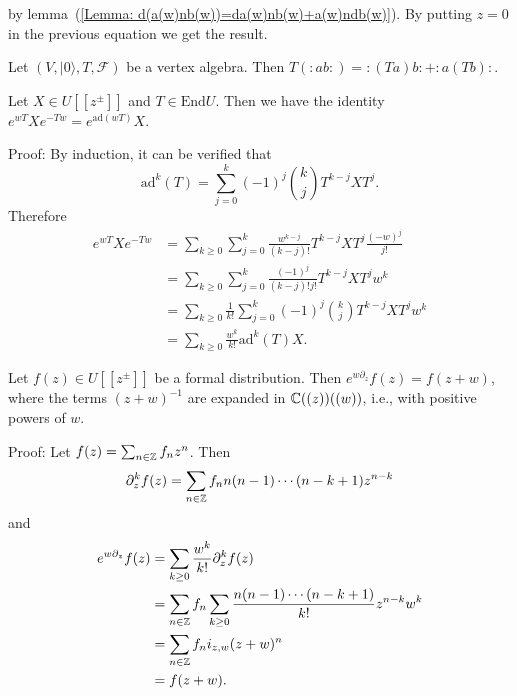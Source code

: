 by lemma~(\ref{Lemma: d(a(w)nb(w))=da(w)nb(w)+a(w)ndb(w)}). By putting $z=0$ in the previous equation we get the result.
\begin{dang}
    \begin{corollary}\label{Corollary: T acts as a derivaiton of the normal ordered product}\cite{de2006finite}
        Let $(V,|0\rangle,T,\mathcal{F})$ be a vertex algebra. Then $T(:ab:)=:(Ta)b:+:a(Tb):$.
    \end{corollary}
\end{dang}
\begin{dang}
    \begin{lemma}\label{Lemma: cojugation by the action of infinitesimal translations}
        Let $X\in U[[z^\pm]]$ and $T\in\text{End}U$. Then we have the identity $e^{wT}Xe^{-Tw}=e^{\text{ad}(wT)}X$.
    \end{lemma}
\end{dang}
Proof: By induction, it can be verified that 
\begin{equation}
    \text{ad}^k(T)=\sum_{j=0}^k(-1)^j\binom{k}{j}T^{k-j}XT^j.
\end{equation}
Therefore
\begin{equation}
    \begin{split}
        e^{wT}Xe^{-Tw}&=\sum_{k\geq0}\sum_{j=0}^k\frac{w^{k-j}}{(k-j)!}T^{k-j}XT^j\frac{(-w)^j}{j!}\\
        &=\sum_{k\geq0}\sum_{j=0}^k\frac{(-1)^j}{(k-j)!j!}T^{k-j}XT^jw^k\\
        &=\sum_{k\geq0}\frac{1}{k!}\sum_{j=0}^k(-1)^j\binom{k}{j}T^{k-j}XT^jw^k\\
        &=\sum_{k\geq0}\frac{w^k}{k!}\text{ad}^k(T)X.
    \end{split}
\end{equation}
\begin{dang}
    \begin{lemma}\label{Lemma: formal taylor lemma}
        Let $f(z)\in U[[z^\pm]]$ be a formal distribution. Then $e^{w\partial_z}f(z)=f(z+w)$, where the terms $(z+w)^{-1}$ are expanded in $\mathbb{C}((z))((w))$, i.e., with positive powers of $w$.
    \end{lemma}
\end{dang}
Proof: Let $f(z)=\sum_{n\in\mathbb{Z}}f_nz^n$. Then 
\begin{equation}
    \partial_z^kf(z)=\sum_{n\in\mathbb{Z}}f_nn(n-1)\cdots(n-k+1)z^{n-k}
\end{equation}
and
\begin{equation}
\begin{split}
    e^{w\partial_z}f(z)&=\sum_{k\geq0}\frac{w^k}{k!}\partial_z^kf(z)\\
    &=\sum_{n\in\mathbb{Z}}f_n\sum_{k\geq0}\frac{n(n-1)\cdots(n-k+1)}{k!}z^{n-k}w^k\\
    &=\sum_{n\in\mathbb{Z}}f_ni_{z,w}(z+w)^n\\
    &=f(z+w).
\end{split}
\end{equation}
